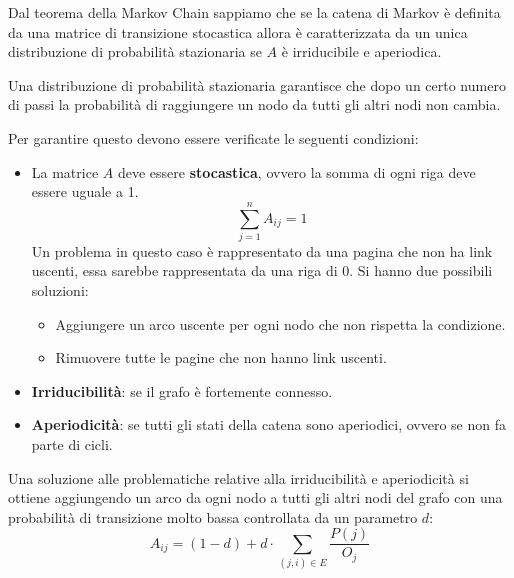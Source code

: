 Dal teorema della Markov Chain sappiamo che se la catena di Markov è definita da
una matrice di transizione stocastica allora è caratterizzata da un unica
distribuzione di probabilità stazionaria se $A$ è irriducibile e aperiodica.
\begin{nota}
    Una distribuzione di probabilità stazionaria garantisce che dopo un certo
    numero di passi la probabilità di raggiungere un nodo da tutti gli altri
    nodi non cambia.
\end{nota}
Per garantire questo devono essere verificate le seguenti condizioni:
\begin{itemize}
    \item La matrice $A$ deve essere \textbf{stocastica}, ovvero la somma di ogni riga
          deve essere uguale a 1.
          \begin{equation*}
              \sum_{j = 1}^n A_{ij} = 1
          \end{equation*}
          Un problema in questo caso è rappresentato da una pagina che non ha
          link uscenti, essa sarebbe rappresentata da una riga di $0$. Si hanno
          due possibili soluzioni:
          \begin{itemize}
              \item Aggiungere un arco uscente per ogni nodo che non rispetta la
                    condizione.
              \item Rimuovere tutte le pagine che non hanno link uscenti.
          \end{itemize}
    \item \textbf{Irriducibilità}: se il grafo è fortemente connesso.
    \item \textbf{Aperiodicità}: se tutti gli stati della catena sono aperiodici,
          ovvero se non fa parte di cicli.
\end{itemize}
Una soluzione alle problematiche relative alla irriducibilità e aperiodicità
si ottiene aggiungendo un arco da ogni nodo a tutti gli altri nodi del grafo con
una probabilità di transizione molto bassa controllata da un parametro $d$:
\begin{equation}
    A_{ij} = (1 - d) + d \cdot \sum_{(j, i) \in E}\frac{P(j)}{O_j}
\end{equation}


